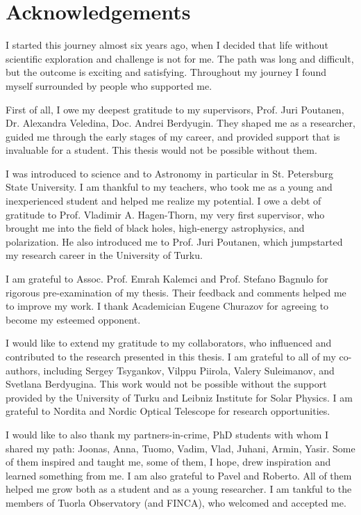 
\chapter*{Acknowledgements}
\thispagestyle{plain}
I started this journey almost six years ago, when I decided that life without scientific exploration and challenge is not for me.
The path was long and difficult, but the outcome is exciting and satisfying.
Throughout my journey I found myself surrounded by people who supported me.

First of all, I owe my deepest gratitude to my supervisors, Prof. Juri Poutanen, Dr. Alexandra Veledina, Doc. Andrei Berdyugin.
They shaped me as a researcher, guided me through the early stages of my career, and provided support that is invaluable for a student.
This thesis would not be possible without them.

I was introduced to science and to Astronomy in particular in St. Petersburg State University. 
I am thankful to my teachers, who took me as a young and inexperienced student and helped me realize my potential.
I owe a debt of gratitude to Prof. Vladimir A. Hagen-Thorn, my very first supervisor, who brought me into the field of black holes, high-energy astrophysics, and polarization. 
He also introduced me to Prof. Juri Poutanen, which jumpstarted my research career in the University of Turku.

I am grateful to Assoc. Prof. Emrah Kalemci and Prof. Stefano Bagnulo for rigorous pre-examination of my thesis.
Their feedback and comments helped me to improve my work.
I thank Academician Eugene Churazov for agreeing to become my esteemed opponent.

I would like to extend my gratitude to my collaborators, who influenced and contributed to the research presented in this thesis.
I am grateful to all of my co-authors, including Sergey Tsygankov, Vilppu Piirola, Valery Suleimanov, and Svetlana Berdyugina.
This work would not be possible without the support provided by the University of Turku and Leibniz Institute for Solar Physics.
I am grateful to Nordita and Nordic Optical Telescope for research opportunities.

I would like to also thank my partners-in-crime, PhD students with whom I shared my path: Joonas, Anna, Tuomo, Vadim, Vlad, Juhani, Armin, Yasir.
Some of them inspired and taught me, some of them, I hope, drew inspiration and learned something from me.
I am also grateful to Pavel and Roberto.
All of them helped me grow both as a student and as a young researcher.
I am tankful to the members of Tuorla Observatory (and FINCA), who welcomed and accepted me.

